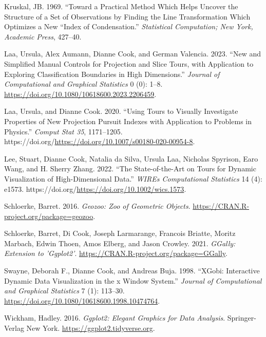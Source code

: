 \documentclass{article}
\newlength{\cslhangindent}
\newlength{\cslentryspacingunit} %
\newenvironment{CSLReferences}[2] %
 {%
  \setlength{\parindent}{0pt}
  \ifodd #1
  \let\oldpar\par
  \def\par{\hangindent=\cslhangindent\oldpar}
  \fi
  \setlength{\parskip}{#2\cslentryspacingunit}
 }%
 {}
\begin{document}
\begin{CSLReferences}{1}{0}
\leavevmode{}%
Kruskal, JB. 1969. {``Toward a Practical Method Which Helps Uncover the
Structure of a Set of Observations by Finding the Line Transformation
Which Optimizes a New ``Index of Condensation.''} \emph{Statistical
Computation; New York, Academic Press}, 427--40.

\leavevmode{}%
Laa, Ursula, Alex Aumann, Dianne Cook, and German Valencia. 2023. {``New
and Simplified Manual Controls for Projection and Slice Tours, with
Application to Exploring Classification Boundaries in High
Dimensions.''} \emph{Journal of Computational and Graphical Statistics}
0 (0): 1--8. \url{https://doi.org/10.1080/10618600.2023.2206459}.

\leavevmode{}%
Laa, Ursula, and Dianne Cook. 2020. {``Using Tours to Visually
Investigate Properties of New Projection Pursuit Indexes with
Application to Problems in Physics.''} \emph{Comput Stat 35},
1171--1205.
https://doi.org/\url{https://doi.org/10.1007/s00180-020-00954-8}.

\leavevmode{}%
Lee, Stuart, Dianne Cook, Natalia da Silva, Ursula Laa, Nicholas
Spyrison, Earo Wang, and H. Sherry Zhang. 2022. {``The State-of-the-Art
on Tours for Dynamic Visualization of High-Dimensional Data.''}
\emph{WIREs Computational Statistics} 14 (4): e1573.
https://doi.org/\url{https://doi.org/10.1002/wics.1573}.

\leavevmode{}%
Schloerke, Barret. 2016. \emph{Geozoo: Zoo of Geometric Objects}.
\url{https://CRAN.R-project.org/package=geozoo}.

\leavevmode{}%
Schloerke, Barret, Di Cook, Joseph Larmarange, Francois Briatte, Moritz
Marbach, Edwin Thoen, Amos Elberg, and Jason Crowley. 2021.
\emph{GGally: Extension to 'Ggplot2'}.
\url{https://CRAN.R-project.org/package=GGally}.

\leavevmode{}%
Swayne, Deborah F., Dianne Cook, and Andreas Buja. 1998. {``XGobi:
Interactive Dynamic Data Visualization in the x Window System.''}
\emph{Journal of Computational and Graphical Statistics} 7 (1): 113--30.
\url{https://doi.org/10.1080/10618600.1998.10474764}.

\leavevmode{}%
Wickham, Hadley. 2016. \emph{Ggplot2: Elegant Graphics for Data
Analysis}. Springer-Verlag New York.
\url{https://ggplot2.tidyverse.org}.


\end{CSLReferences}
\end{document}
